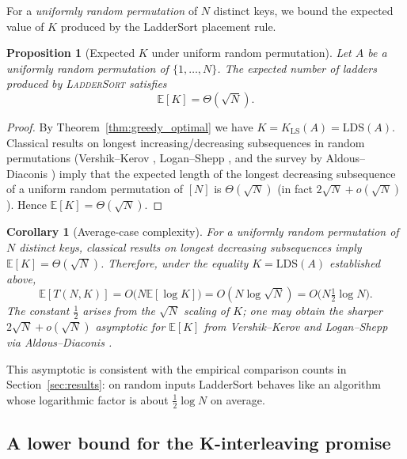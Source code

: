 \documentclass{ieeeaccess}
\theoremstyle{plain}
\newtheorem{proposition}{Proposition}[section]
\newtheorem{corollary}[theorem]{Corollary}
\theoremstyle{definition}
\begin{document}
For a \emph{uniformly random permutation} of $N$ distinct keys, we bound the
expected value of $K$ produced by the LadderSort placement rule.

\begin{proposition}[Expected $K$ under uniform random permutation]
\label{prop:avgcase}
Let $A$ be a uniformly random permutation of $\{1, \dots, N\}$.  The
expected number of ladders produced by \textsc{LadderSort} satisfies
\[
  \mathbb{E}[K] = \Theta(\sqrt{N}).
\]
\end{proposition}

\begin{proof}
By Theorem~\ref{thm:greedy_optimal} we have $K=K_{\mathrm{LS}}(A)=\mathrm{LDS}(A)$.
Classical results on longest increasing/decreasing subsequences in random
permutations (Vershik--Kerov \cite{VershikKerov1977},
Logan--Shepp \cite{LoganShepp1977}, and the survey by
Aldous--Diaconis \cite{AldousDiaconis1999}) imply that the expected length
of the longest decreasing subsequence of a uniform random permutation of
$[N]$ is $\Theta(\sqrt{N})$ (in fact $2\sqrt{N}+o(\sqrt{N})$).  Hence
$\mathbb{E}[K]=\Theta(\sqrt{N})$.
\end{proof}

\begin{corollary}[Average-case complexity]
\label{cor:avgcase}
For a uniformly random permutation of $N$ distinct keys, classical results
on longest decreasing subsequences imply $\mathbb{E}[K]=\Theta(\sqrt{N})$.
Therefore, under the equality $K=\mathrm{LDS}(A)$ established above,
\[ \mathbb{E}[T(N,K)] = O\bigl(N\mathbb{E}[\log K]\bigr) = O(N\log\sqrt{N}) = O\bigl(N\tfrac{1}{2}\log N\bigr).
\]
The constant $\tfrac{1}{2}$ arises from the $\sqrt{N}$ scaling of $K$; one
may obtain the sharper $2\sqrt{N}+o(\sqrt{N})$ asymptotic for $\mathbb{E}[K]$
from Vershik--Kerov and Logan--Shepp via Aldous--Diaconis \cite{VershikKerov1977,LoganShepp1977,AldousDiaconis1999}.
\end{corollary}


This asymptotic is consistent with the empirical comparison counts in
Section~\ref{sec:results}: on random inputs LadderSort behaves like an
algorithm whose logarithmic factor is about $\tfrac{1}{2}\log N$ on average.

\subsection{A lower bound for the K-interleaving promise}
\label{sec:lowerbound}
\end{document}
